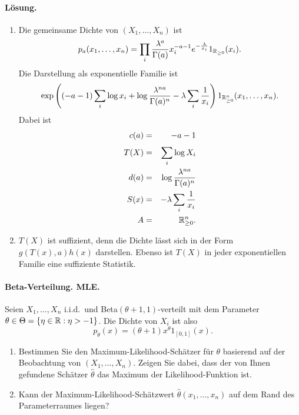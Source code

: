 \paragraph*{Lösung.}
\begin{enumerate}
    \item Die gemeinsame Dichte von $\left( X_1,\ldots,X_n \right)$ ist 
        \begin{equation*}
            p_a(x_1,\ldots,x_n) = 
            \prod_i \frac{\lambda^a}{\Gamma(a)}x_i^{-a-1} e^{-\frac{\lambda}{x_i}}1_{\mathbb R_{\geq 0}}(x_i).
        \end{equation*}
        Die Darstellung als exponentielle Familie ist
        \begin{equation*}
            \exp \left( \left( -a-1 \right) \sum_{i}^{} \log x_i + \log \frac{\lambda^{na}}{\Gamma(a)^n} - \lambda \sum_{i}^{} \frac{1}{x_i}  \right) 1_{\mathbb R_{\geq 0}^n} (x_1,\ldots,x_n).
        \end{equation*}
        Dabei ist 
        \begin{eqnarray*}
            c(a)&=&  -a-1 \\
            T(X)&=& \sum_{i}^{} \log X_i \\
            d(a)&=& \log \frac{\lambda^{na}}{\Gamma(a)^n} \\
            S(x)&=&  -\lambda \sum_{i}^{} \frac{1}{x_i}\\
            A   &=& \mathbb R_{\geq 0}^n.
        \end{eqnarray*}

    \item $T(X)$ ist suffizient, denn die Dichte lässt sich in der Form
        $g(T(x),a)h(x)$ darstellen. Ebenso ist $T(X)$ in jeder exponentiellen
        Familie eine suffiziente Statistik. 
\end{enumerate}



\paragraph{Beta-Verteilung. MLE.} Seien $X_1,\ldots,X_n$ i.i.d.\ und Beta$(\theta+1, 1)$-verteilt
mit dem Parameter $\theta\in\Theta= \left\{ \eta\in\mathbb R : \eta>-1 \right\}$. Die Dichte von $X_i$ ist also
\begin{equation*}
    p_\theta(x) = (\theta+1)x^\theta 1_{ [0,1] }(x).
\end{equation*}
\begin{enumerate}

    \item Bestimmen Sie den Maximum-Likelihood-Schätzer für $\theta$ basierend
        auf der Beobachtung von $\left( X_1,\ldots,X_n \right)$. Zeigen Sie
        dabei, dass der von Ihnen gefundene Schätzer $\hat \theta$ das Maximum
        der Likelihood-Funktion ist. 

    \item Kann der Maximum-Likelihood-Schätzwert $\hat \theta\left( x_1,\ldots,x_n \right)$
        auf dem Rand des Parameterraumes liegen? 
\end{enumerate}

